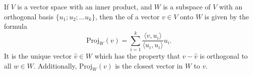

\endedxproblem


\endedxvertical













If $V$ is a vector space with an inner product, and $W$ is a subspace of $V$ with an orthogonal basis 
$\{u_1; u_2; \ldots u_k\}$, then the {} of a vector $v\in V$ onto $W$ is given by the formula
\[\mathrm{Proj}_W(v) =  \sum_{i=1}^k \frac{\langle v, u_i \rangle}{\langle u_i, u_i \rangle} u_i.\]
It is the unique vector $\hat{v} \in W$
which has the property that $v-\hat{v}$ is orthogonal to all $w\in W$.  Additionally, $\mathrm{Proj}_W(v)$ is 
the closest vector in $W$ to $v$.  


\endedxtext



\endedxvertical





